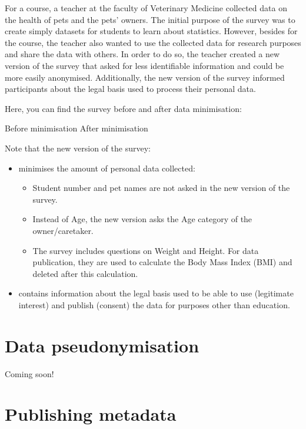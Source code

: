 \documentclass[
]{book}
\providecommand{\tightlist}{%
  \setlength{\itemsep}{0pt}\setlength{\parskip}{0pt}}
\begin{document}
For a course, a teacher at the faculty of Veterinary Medicine collected data on
the health of pets and the pets' owners. The initial purpose of the survey was
to create simply datasets for students to learn about statistics. However,
besides for the course, the teacher also wanted to use the collected data for
research purposes and share the data with others. In order to do so, the teacher
created a new version of the survey that asked for less identifiable information
and could be more easily anonymised. Additionally, the new version of the survey
informed participants about the legal basis used to process their personal data.

Here, you can find the survey before and after data minimisation:

Before minimisation
After minimisation

Note that the new version of the survey:

\begin{itemize}
\tightlist
\item
  minimises the amount of personal data collected:

  \begin{itemize}
  \tightlist
  \item
    Student number and pet names are not asked in the new version of the survey.
  \item
    Instead of Age, the new version asks the Age category of the owner/caretaker.
  \item
    The survey includes questions on Weight and Height. For data publication,
    they are used to calculate the Body Mass Index (BMI) and deleted after this
    calculation.
  \end{itemize}
\item
  contains information about the legal basis used to be able to use (legitimate
  interest) and publish (consent) the data for purposes other than education.
\end{itemize}

\hypertarget{youth-pseudonymisation}{%
\chapter{Data pseudonymisation}\label{youth-pseudonymisation}}

Coming soon!

\hypertarget{open-science-questionnaire}{%
\chapter{Publishing metadata}\label{open-science-questionnaire}}
\end{document}
